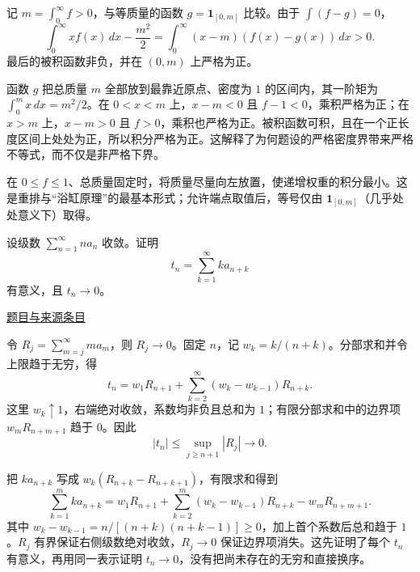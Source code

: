 \documentclass[12pt,fontset=fandol]{ctexart}
\begin{document}
\begin{solve}\label{ans:fin02-all:2}

记 $m=\int_0^\infty f>0$，与等质量的函数 $g=\boldsymbol1_{[0,m]}$ 比较。由于 $\int(f-g)=0$，
\[
\int_0^\infty xf(x)\,dx-\frac{m^2}{2}
=\int_0^\infty(x-m)(f(x)-g(x))\,dx>0.
\]
最后的被积函数非负，并在 $(0,m)$ 上严格为正。

函数 $g$ 把总质量 $m$ 全部放到最靠近原点、密度为 $1$ 的区间内，其一阶矩为 $\int_0^m x\,dx=m^2/2$。在 $0<x<m$ 上，$x-m<0$ 且 $f-1<0$，乘积严格为正；在 $x>m$ 上，$x-m>0$ 且 $f>0$，乘积也严格为正。被积函数可积，且在一个正长度区间上处处为正，所以积分严格为正。这解释了为何题设的严格密度界带来严格不等式，而不仅是非严格下界。

\end{solve}

\begin{remark}[方法与条件]在 $0\le f\le1$、总质量固定时，将质量尽量向左放置，使递增权重的积分最小。这是重排与“浴缸原理”的最基本形式；允许端点取值后，等号仅由 $\boldsymbol1_{[0,m]}$（几乎处处意义下）取得。\end{remark}

\begin{example}[来源序号3]\label{ex:fin02-all:3}\label{pr:fin02-all:3}

设级数 $\sum_{n=1}^\infty na_n$ 收敛。证明
\[
t_n=\sum_{k=1}^\infty ka_{n+k}
\]
有意义，且 $t_n\to0$。

\par\href{https://github.com/lzxcr/cmc-mathematics/blob/64916fa1fdbc3e444a652eca204d5669058ee321/src/problems/finals/02/03.md}{题目与来源条目}

\end{example}

\begin{solve}\label{ans:fin02-all:3}

令 $R_j=\sum_{m=j}^\infty ma_m$，则 $R_j\to0$。固定 $n$，记 $w_k=k/(n+k)$。分部求和并令上限趋于无穷，得
\[
t_n=w_1R_{n+1}+\sum_{k=2}^\infty(w_k-w_{k-1})R_{n+k}.
\]
这里 $w_k\uparrow1$，右端绝对收敛，系数均非负且总和为 $1$；有限分部求和中的边界项 $w_mR_{n+m+1}$ 趋于 $0$。因此
\[
|t_n|\le\sup_{j\ge n+1}|R_j|\longrightarrow0.
\]

把 $ka_{n+k}$ 写成 $w_k(R_{n+k}-R_{n+k+1})$，有限求和得到
\[
\sum_{k=1}^mka_{n+k}=w_1R_{n+1}+\sum_{k=2}^m(w_k-w_{k-1})R_{n+k}-w_mR_{n+m+1}.
\]
其中 $w_k-w_{k-1}=n/[(n+k)(n+k-1)]\ge0$，加上首个系数后总和趋于 $1$。$R_j$ 有界保证右侧级数绝对收敛，$R_j\to0$ 保证边界项消失。这先证明了每个 $t_n$ 有意义，再用同一表示证明 $t_n\to0$，没有把尚未存在的无穷和直接换序。

\end{solve}
\end{document}
